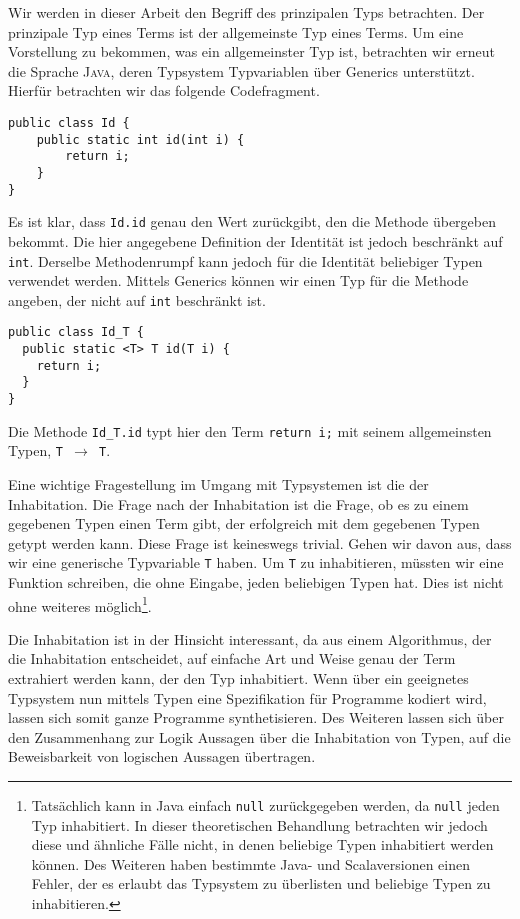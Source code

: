 Wir werden in dieser Arbeit den Begriff des prinzipalen Typs betrachten. Der prinzipale Typ eines Terms ist der allgemeinste Typ eines Terms. Um eine Vorstellung zu bekommen, was ein allgemeinster Typ ist, betrachten wir erneut die Sprache \textsc{Java}, deren Typsystem Typvariablen über Generics unterstützt. Hierfür betrachten wir das folgende Codefragment.
\begin{verbatim}
public class Id {
    public static int id(int i) { 
        return i;
    }
}
\end{verbatim}

Es ist klar, dass \texttt{Id.id} genau den Wert zurückgibt, den die Methode übergeben bekommt. Die hier angegebene Definition der Identität ist jedoch beschränkt auf \texttt{int}. Derselbe Methodenrumpf kann jedoch für die Identität beliebiger Typen verwendet werden. Mittels Generics können wir einen Typ für die Methode angeben, der nicht auf \texttt{int} beschränkt ist.

\begin{verbatim}
public class Id_T {
  public static <T> T id(T i) { 
    return i;
  }
}
\end{verbatim}

Die Methode \texttt{Id\_T.id} typt hier den Term \texttt{return i;} mit seinem allgemeinsten Typen, \texttt{T $\to$ T}.

Eine wichtige Fragestellung im Umgang mit Typsystemen ist die der Inhabitation. Die Frage nach der Inhabitation ist die Frage, ob es zu einem gegebenen Typen einen Term gibt, der erfolgreich mit dem gegebenen Typen getypt werden kann. Diese Frage ist keineswegs trivial. Gehen wir davon aus, dass wir eine generische Typvariable \texttt{T} haben. Um \texttt{T} zu inhabitieren, müssten wir eine Funktion schreiben, die ohne Eingabe, jeden beliebigen Typen hat. Dies ist nicht ohne weiteres möglich\footnote{Tatsächlich kann in Java einfach \texttt{null} zurückgegeben werden, da \texttt{null} jeden Typ inhabitiert. In dieser theoretischen Behandlung betrachten wir jedoch diese und ähnliche Fälle nicht, in denen beliebige Typen inhabitiert werden können. Des Weiteren haben bestimmte Java- und Scalaversionen einen Fehler, der es erlaubt das Typsystem zu überlisten und beliebige Typen zu inhabitieren.\cite{unsound}}. 

Die Inhabitation ist in der Hinsicht interessant, da aus einem Algorithmus, der die Inhabitation entscheidet, auf einfache Art und Weise genau der Term extrahiert werden kann, der den Typ inhabitiert. Wenn über ein geeignetes Typsystem nun mittels Typen eine Spezifikation für Programme kodiert wird, lassen sich somit ganze Programme synthetisieren\cite{cls}. Des Weiteren lassen sich über den Zusammenhang zur Logik Aussagen über die Inhabitation von Typen, auf die Beweisbarkeit von logischen Aussagen übertragen.

